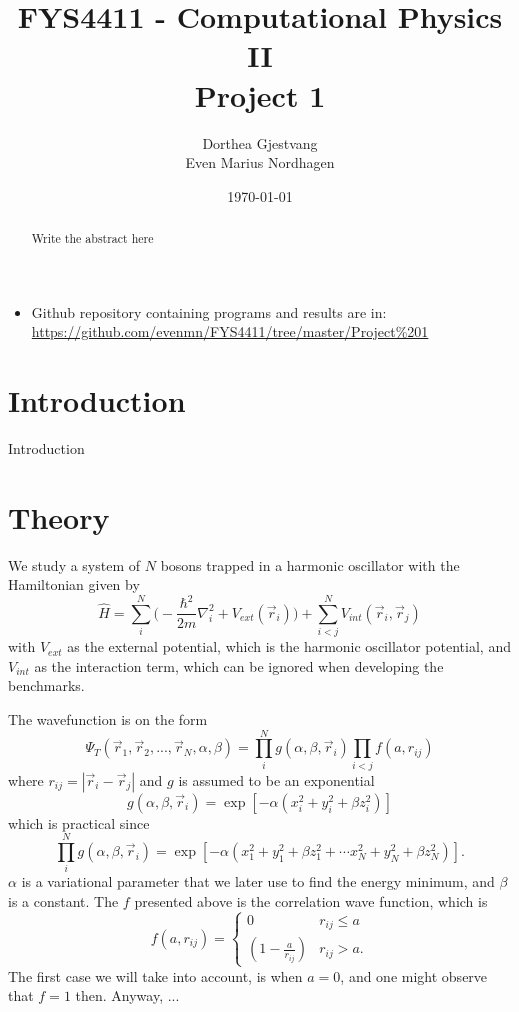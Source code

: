 \documentclass[norsk,a4paper,12pt]{article}
\title{FYS4411 - Computational Physics II\\\vspace{2mm} \Large{Project 1}}
\author{\large Dorthea Gjestvang\\ Even Marius Nordhagen}
\date\today
\begin{document}
\maketitle
\begin{abstract}
Write the abstract here
\par 

\end{abstract}


\begin{itemize}
\item Github repository containing programs and results are in: \url{https://github.com/evenmn/FYS4411/tree/master/Project%201}
\end{itemize}


\section{Introduction}
Introduction

\section{Theory}
We study a system of $N$ bosons trapped in a harmonic oscillator with the Hamiltonian given by 
\begin{equation}
\hat{H}=\sum_i^N\bigg(-\frac{\hbar^2}{2m}\nabla_i^2+V_{ext}(\vec{r}_i)\bigg)+\sum_{i<j}^NV_{int}(\vec{r}_i,\vec{r}_j)
\end{equation}
with $V_{ext}$ as the external potential, which is the harmonic oscillator potential,
and $V_{int}$ as the interaction term, which can be ignored when developing the benchmarks. 

The wavefunction is on the form 
\begin{equation}
\Psi_T(\vec{r}_1, \vec{r}_2, ..., \vec{r}_N, \alpha, \beta)=\prod_i^Ng(\alpha, \beta, \vec{r}_i)\prod_{i<j}f(a,r_{ij})
\end{equation}
where $r_{ij}=|\vec{r}_i-\vec{r}_j|$ and $g$ is assumed to be an exponential
\begin{equation}
g(\alpha, \beta, \vec{r}_i)=\exp[-\alpha(x_i^2+y_i^2+\beta z_i^2)]
\end{equation}
which is practical since
\begin{equation}
\prod_i^Ng(\alpha, \beta, \vec{r}_i)=\exp[-\alpha(x_1^2+y_1^2+\beta z_1^2+\cdots x_N^2+y_N^2+\beta z_N^2)].
\end{equation}
$\alpha$ is a variational parameter that we later use to find the energy minimum, and $\beta$ is a constant. The $f$ presented above is the correlation wave function, which is 
\begin{equation}
f(a,r_{ij})=
\begin{cases} 
   0 & r_{ij} \leq a \\
   \left(1-\frac{a}{r_{ij}}\right) & r_{ij} > a.
\end{cases}
\end{equation}
The first case we will take into account, is when $a=0$, and one might observe that $f=1$ then. Anyway, ...
\end{document}
